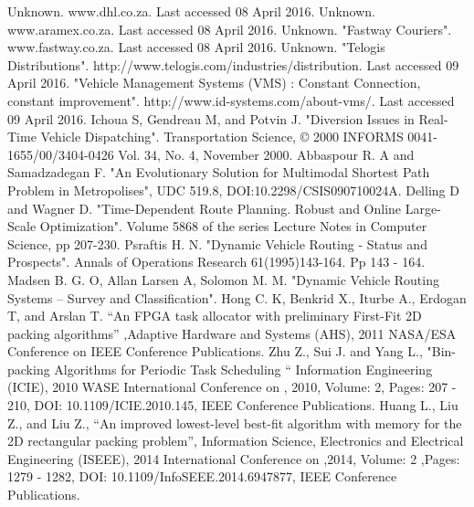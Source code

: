 \documentclass[paper=a4, fontsize=11pt]{scrartcl} %
\numberwithin{equation}{section} %
\numberwithin{figure}{section} %
\numberwithin{table}{section} %
\begin{document}
\begin{thebibliography}{sorting}

Unknown. www.dhl.co.za. Last accessed 08 April 2016.
Unknown. www.aramex.co.za. Last accessed 08 April 2016.
Unknown. "Fastway Couriers". www.fastway.co.za. Last accessed 08 April 2016.
Unknown. "Telogis Distributions". http://www.telogis.com/industries/distribution. Last accessed 09 April 2016.
"Vehicle Management Systems (VMS) :  Constant Connection, constant improvement". http://www.id-systems.com/about-vms/. Last accessed 09 April 2016.
Ichoua S, Gendreau M, and Potvin J. "Diversion Issues in Real-Time Vehicle Dispatching". Transportation Science, © 2000 INFORMS 0041-1655/00/3404-0426  Vol. 34, No. 4, November 2000.
Abbaspour R. A and Samadzadegan F. "An Evolutionary Solution for Multimodal Shortest Path Problem in Metropolises", UDC 519.8, DOI:10.2298/CSIS090710024A. 
Delling D and Wagner D. "Time-Dependent Route Planning. Robust and Online Large-Scale Optimization". Volume 5868 of the series Lecture Notes in Computer Science, pp 207-230.
Psraftis H. N. "Dynamic Vehicle Routing - Status and Prospects". Annals of Operations Research 61(1995)143-164. Pp 143 - 164.
Madsen B. G. O, Allan Larsen A, Solomon M. M. "Dynamic Vehicle Routing Systems – Survey and Classification".
Hong C. K, Benkrid  X., Iturbe A., Erdogan T, and Arslan T. “An FPGA task allocator with preliminary First-Fit 2D packing algorithms” ,Adaptive Hardware and Systems (AHS), 2011 NASA/ESA Conference on IEEE Conference Publications.
Zhu Z., Sui J. and Yang L., "Bin-packing Algorithms for Periodic Task Scheduling “ Information Engineering (ICIE), 2010 WASE International Conference on , 2010, Volume: 2, Pages: 207 - 210, DOI: 10.1109/ICIE.2010.145, IEEE Conference Publications.
Huang L., Liu Z., and Liu Z., “An improved lowest-level best-fit algorithm with memory for the 2D rectangular packing problem”, Information Science, Electronics and Electrical Engineering (ISEEE), 2014 International Conference on ,2014, Volume: 2 ,Pages: 1279 - 1282, DOI: 10.1109/InfoSEEE.2014.6947877, IEEE Conference Publications.




\end{thebibliography}



















\end{document}
